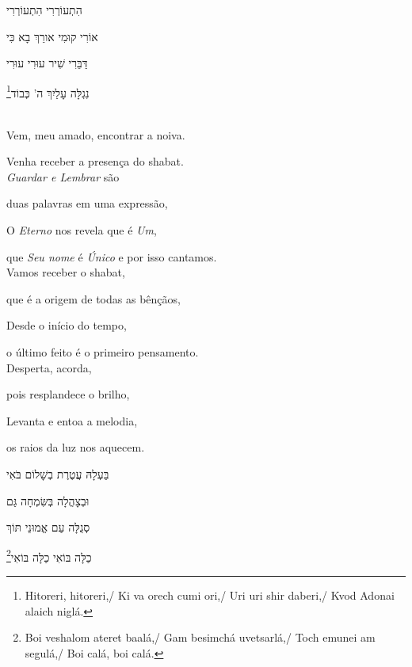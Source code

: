 הִתְעוֹרְרִי הִתְעוֹרְרִי

אוֹרִי קוּמִי אורֵךְ בָא כִּי

דַּבֵּרִי שִׁיר עוּרִי עוּרִי

נִגְלָּה עָלַיִךְ ה' כְּבוֹד\footnote{Hitoreri, hitoreri,/ Ki va orech cumi ori,/ Uri uri shir daberi,/
Kvod Adonai alaich niglá.}\\[10pt]

\movetooddpage
\raggedright

\vspace*{1cm}

\textsc{}\\[15pt]

Vem, meu amado, encontrar a noiva.

Venha receber a presença do shabat.\\[10pt]

\emph{Guardar e Lembrar} são

duas palavras em uma expressão,

O \emph{Eterno} nos revela que é \emph{Um},

que \emph{Seu nome} é \emph{Único} e por isso cantamos.\\[10pt]

Vamos receber o shabat,

que é a origem de todas as bênçãos,

Desde o início do tempo,

o último feito é o primeiro pensamento.\\[10pt]

Desperta, acorda,

pois resplandece o brilho,

Levanta e entoa a melodia,

os raios da luz nos aquecem.\\[10pt]

\movetoevenpage
\raggedleft

\vspace*{1cm}

בַּעְלָהּ עֲטֶרֶת בְשָׁלוֹם בֹּאִי

וּבְצָהֳלָה בְּשִּׂמְחָה גַּם 

סְגֻלָּה עַם אֱמוּנֵי תּוֹךְ 

כַלָּה בּוֹאִי כַלָּה בּוֹאִי\footnote{
Boi veshalom ateret baalá,/ Gam besimchá uvetsarlá,/
Toch emunei am segulá,/ Boi calá, boi calá.}


\movetooddpage
\raggedright

\vspace*{1cm}

